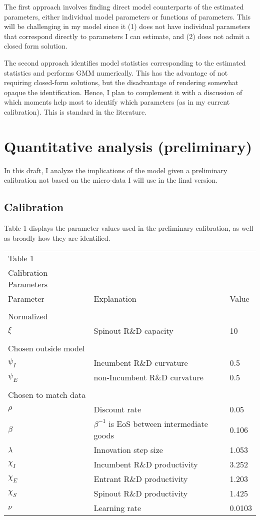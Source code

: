 \documentclass[12pt,english]{article}
\theoremstyle{remark}
\begin{document}
The first approach involves finding direct model counterparts of the estimated parameters, either individual model parameters or functions of parameters. This will be challenging in my model since it (1) does not have individual parameters that correspond directly to parameters I can estimate, and (2) does not admit a closed form solution.

The second approach identifies model statistics corresponding to the estimated statistics and performs GMM numerically. This has the advantage of not requiring closed-form solutions, but the disadvantage of rendering somewhat opaque the identification. Hence, I plan to complement it with a discussion of which moments help most to identify which parameters (as in my current calibration). This is standard in the literature.

\section{Quantitative analysis (preliminary)}\label{quantitative_analysis}

In this draft, I analyze the implications of the model given a preliminary calibration not based on the micro-data I will use in the final version.

\subsection{Calibration}

Table 1 displays the parameter values used in the preliminary calibration, as well as broadly how they are identified.

\begin{table}[h]
	\centering{}%
	\begin{tabular}{lll}
		Table 1 &  &  \tabularnewline
		Calibration Parameters &  &  \tabularnewline
		\hline 
		Parameter & Explanation & Value\tabularnewline
		\tabularnewline
		\hline 
		Normalized & & \tabularnewline
		$\xi$ & Spinout R\&D capacity & 10 \tabularnewline
		&  & \tabularnewline
		Chosen outside model & & \tabularnewline
		$\psi_I$ & Incumbent R\&D curvature & 0.5\tabularnewline
		$\psi_E$ & non-Incumbent R\&D curvature & 0.5\tabularnewline
		&  & \tabularnewline
		Chosen to match data & & \tabularnewline
		$\rho$ & Discount rate & 0.05\tabularnewline
		$\beta$ & $\beta^{-1}$ is EoS between intermediate goods & 0.106\tabularnewline
		$\lambda$ & Innovation step size & 1.053\tabularnewline
		$\chi_I$ & Incumbent R\&D productivity & 3.252\tabularnewline
		$\chi_E$ & Entrant R\&D productivity & 1.203\tabularnewline
		$\chi_S$ & Spinout R\&D productivity & 1.425\tabularnewline
		$\nu$ & Learning rate & 0.0103
	\end{tabular}
\end{table}
\end{document}
